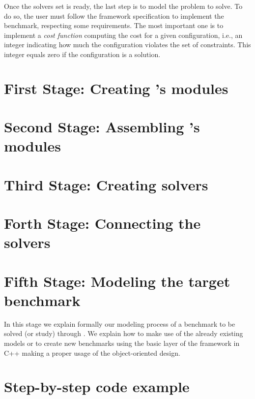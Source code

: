 Once the solvers set is ready, the last step is to model the problem to solve. To do so, the user must follow the framework specification to implement the benchmark, respecting some requirements. The most important one is to implement a {\it cost function} computing the cost for a given configuration, i.e., an integer indicating how much the configuration violates the set of constraints. This integer equals zero if the configuration is a solution.

\section{First Stage: Creating \posl's modules}
\label{sec:1ststage}



\section{Second Stage: Assembling \posl's modules}
\label{sec:2ndstage}



\section{Third Stage: Creating \posl{} solvers}
\label{sec:3rdstage}



\section{Forth Stage: Connecting the solvers}
\label{sec:4thstage}



\section{Fifth Stage: Modeling the target benchmark}

In this stage we explain formally our modeling process of a benchmark to be solved (or study) through \posl{}. We explain how to make use of the already existing models or to create new benchmarks using the basic layer of the framework in C++ making a proper usage of the object-oriented design.

\section{Step-by-step \posl{} code example}

